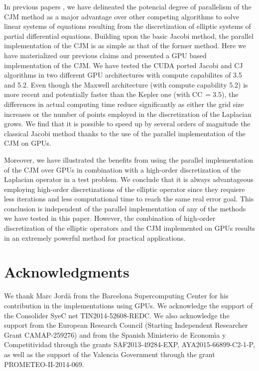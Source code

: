 \documentclass[preprint,12pt]{elsarticle}
\begin{document}
In previous papers \cite{
    Adsuara2016369,Adsuara2017446}, we have delineated the potencial
  degree of parallelism of the CJM method as a major advantage over
  other competing algorithms to solve linear systems of equations
  resulting from the discretization of elliptic systems of partial
  differential equations. Building upon the basic Jacobi method, the
  parallel implementation of the CJM is as simple as that of the
  former method. Here we have materialized our previous claims and
  presented a GPU based implementation of the CJM. We have tested the
  CUDA ported Jacobi and CJ algorithms in two different GPU
  architectures with compute capabilites of 3.5 and 5.2. Even though
  the Maxwell architecture (with compute capability 5.2) is more
  recent and potentially faster than the Kepler one (with CC\,$=3.5$),
  the differences in actual computing time reduce significantly as
  either the grid size increases or the number of points employed in
  the discretization of the Laplacian grows. We find that it is
possible to speed up by several orders of magnitude the classical Jacobi
method thanks to the use of the parallel implementation of the CJM on GPUs.

Moreover, we have illustrated the benefits from using the parallel
implementation of the CJM over
GPUs in combination with a high-order discretization of the Laplacian
operator in a test problem. We conclude that it is always
  advantageous employing high-order discretizations of the elliptic
  operator since they requiere less iterations and less computational
  time to reach the same real error goal. This conclusion is
  independent of the parallel implementation of any of the methods we
  have tested in this paper. However, the combination of high-order
  discretization of the elliptic operators and the CJM implemented on
  GPUs results in an extremely powerful method for practical
  applications.


\section*{Acknowledgments}
We thank Marc Jord\`{a} from the Barcelona Supercomputing Center for his contribution in the implementations using GPUs. We acknowledge the support of the Consolider SyeC net TIN2014-52608-REDC. We also acknowledge the support from the European Research Council (Starting Independent Researcher Grant CAMAP-259276) and from the Spanish Ministerio de Econom\'{\i}a y Competitividad through the grants SAF2013-49284-EXP, AYA2015-66899-C2-1-P, as well as the support of the Valencia Government through the grant PROMETEO-II-2014-069.



 

\end{document}
